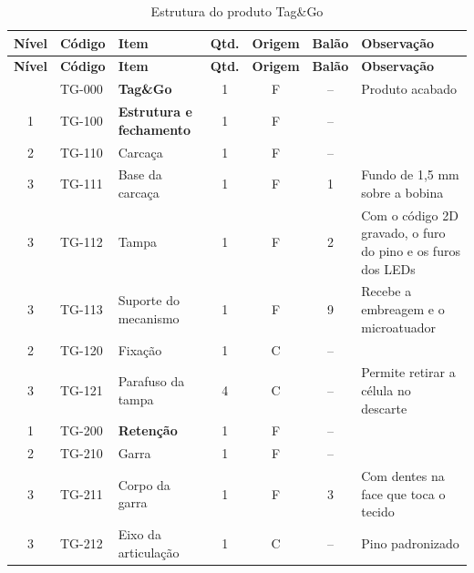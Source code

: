 \begingroup
\footnotesize
\renewcommand{\arraystretch}{1.25}
\begin{longtable}{@{}c l >{\RaggedRight\arraybackslash}p{4.5cm} c c c >{\RaggedRight\arraybackslash}p{4.3cm}@{}}
    \caption{Estrutura do produto Tag\&Go}\label{tab:estrut_lista}\\
    \toprule
    \textbf{Nível} & \textbf{Código} & \textbf{Item} & \textbf{Qtd.} & \textbf{Origem} & \textbf{Balão} & \textbf{Observação} \\
    \midrule
    \endfirsthead
    \toprule
    \textbf{Nível} & \textbf{Código} & \textbf{Item} & \textbf{Qtd.} & \textbf{Origem} & \textbf{Balão} & \textbf{Observação} \\
    \midrule
    \endhead
    \bottomrule
    \endfoot
    0 & TG-000 & \textbf{Tag\&Go} & 1 & F & -- & Produto acabado \\
    \midrule
    1 & TG-100 & \textbf{Estrutura e fechamento} & 1 & F & -- & \\
    2 & TG-110 & \hspace{0.3cm}Carcaça & 1 & F & -- & \\
    3 & TG-111 & \hspace{0.6cm}Base da carcaça & 1 & F & 1 & Fundo de 1,5 mm sobre a bobina \\
    3 & TG-112 & \hspace{0.6cm}Tampa & 1 & F & 2 & Com o código 2D gravado, o furo do pino e os furos dos LEDs \\
    3 & TG-113 & \hspace{0.6cm}Suporte do mecanismo & 1 & F & 9 & Recebe a embreagem e o microatuador \\
    2 & TG-120 & \hspace{0.3cm}Fixação & 1 & C & -- & \\
    3 & TG-121 & \hspace{0.6cm}Parafuso da tampa & 4 & C & -- & Permite retirar a célula no descarte \\
    \midrule
    1 & TG-200 & \textbf{Retenção} & 1 & F & -- & \\
    2 & TG-210 & \hspace{0.3cm}Garra & 1 & F & -- & \\
    3 & TG-211 & \hspace{0.6cm}Corpo da garra & 1 & F & 3 & Com dentes na face que toca o tecido \\
    3 & TG-212 & \hspace{0.6cm}Eixo da articulação & 1 & C & -- & Pino padronizado \\

\end{longtable}
